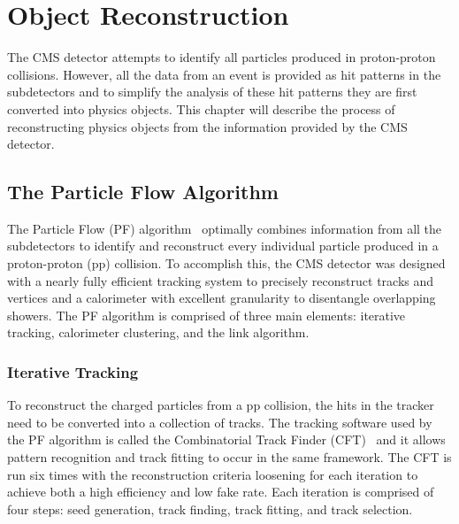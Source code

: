 \chapter{Object Reconstruction}
\label{ch:ObjReco}

The CMS detector attempts to identify all particles produced in proton-proton collisions. However, all the data from an event is provided as hit patterns in the subdetectors and to simplify the analysis of these hit patterns they are first converted into physics objects. This chapter will describe the process of reconstructing physics objects from the information provided by the CMS detector.


\section{The Particle Flow Algorithm}

The Particle Flow (PF) algorithm~\cite{PFAlgorithm, PFReconstruction} optimally combines information from all the subdetectors to identify and reconstruct every individual particle produced in a proton-proton (pp) collision. To accomplish this, the CMS detector was designed with a nearly fully efficient tracking system to precisely reconstruct tracks and vertices and a calorimeter with excellent granularity to disentangle overlapping showers. The PF algorithm is comprised of three main elements: iterative tracking, calorimeter clustering, and the link algorithm.

\subsection{Iterative Tracking}

To reconstruct the charged particles from a pp collision, the hits in the tracker need to be converted into a collection of tracks. The tracking software used by the PF algorithm is called the Combinatorial Track Finder (CFT)~\cite{TrackReco} and it allows pattern recognition and track fitting to occur in the same framework. The CFT is run six times with the reconstruction criteria loosening for each iteration to achieve both a high efficiency and low fake rate. Each iteration is comprised of four steps: seed generation, track finding, track fitting, and track selection.

